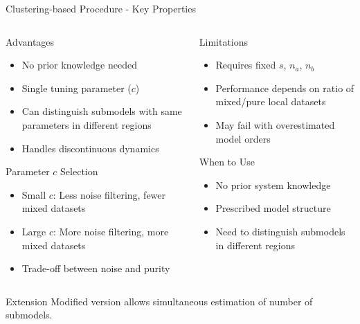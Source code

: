 \documentclass[aspectratio=169]{beamer}
\begin{document}
\begin{frame}{Clustering-based Procedure - Key Properties}
\begin{columns}[t]
\begin{column}{0.5\textwidth}
\begin{block}{Advantages}
\begin{itemize}
\item No prior knowledge needed
\item Single tuning parameter ($c$)
\item Can distinguish submodels with same parameters in different regions
\item Handles discontinuous dynamics
\end{itemize}
\end{block}

\begin{block}{Parameter $c$ Selection}
\begin{itemize}
\item Small $c$: Less noise filtering, fewer mixed datasets
\item Large $c$: More noise filtering, more mixed datasets
\item Trade-off between noise and purity
\end{itemize}
\end{block}
\end{column}
\begin{column}{0.5\textwidth}
\begin{block}{Limitations}
\begin{itemize}
\item Requires fixed $s$, $n_a$, $n_b$
\item Performance depends on ratio of mixed/pure local datasets
\item May fail with overestimated model orders
\end{itemize}
\end{block}

\begin{alertblock}{When to Use}
\begin{itemize}
\item No prior system knowledge
\item Prescribed model structure
\item Need to distinguish submodels in different regions
\end{itemize}
\end{alertblock}
\end{column}
\end{columns}

\vspace{0.3cm}
\begin{exampleblock}{Extension}
Modified version \cite{ferrari2003conditions} allows simultaneous estimation of number of submodels.
\end{exampleblock}
\end{frame}
\end{document}
